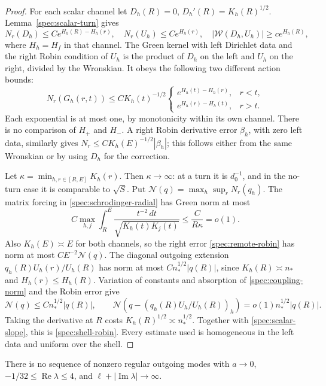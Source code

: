 \begin{proof}
For each scalar channel let $D_h(R)=0$, $D_h'(R)=K_h(R)^{1/2}$.
Lemma~\ref{spec:scalar-turn} gives
\[
 N_r(D_h)\le Ce^{H_h(R)-H_h(r)},\quad
 N_r(U_h)\le Ce^{H_h(r)},\quad
 |\mathcal W(D_h,U_h)|\ge ce^{H_h(R)},
\]
where $H_h=H_f$ in that channel. The Green kernel with left
Dirichlet data and the right Robin condition of $U_h$ is the product
of $D_h$ on the left and $U_h$ on the right, divided by the Wronskian.
It obeys the following two different action bounds:
\begin{equation}\label{spec:green-actions}
 N_r(G_h(r,t))\le C K_h(t)^{-1/2}
 \begin{cases}
 e^{H_h(t)-H_h(r)},&r<t,\\
 e^{H_h(r)-H_h(t)},&r>t.
 \end{cases}
\end{equation}
Each exponential is at most one, by monotonicity within its own
channel. There is no comparison of $H_+$ and $H_-$. A right Robin
derivative error $\beta_h$, with zero left data, similarly gives
$N_r\le CK_h(E)^{-1/2}|\beta_h|$; this follows either from the same
Wronskian or by using $D_h$ for the correction.

Let $\kappa=\min_{h,r\in[R,E]}K_h(r)$. Then $\kappa\to\infty$:
at a turn it is $d_0^{-1}$, and in the no-turn case it is comparable
to $\sqrt S$. Put $\mathcal N(q)=\max_h\sup_rN_r(q_h)$.
The matrix forcing in \eqref{spec:schrodinger-radial} has Green norm
at most
\begin{equation}\label{spec:coupling-norm}
 C\max_{h,j}\int_R^E
 \frac{t^{-2}\,dt}{\sqrt{K_h(t)K_j(t)}}
 \le\frac{C}{R\kappa}=o(1).
\end{equation}
Also $K_h(E)\asymp E$ for both channels, so the right error
\eqref{spec:remote-robin} has norm at most $CE^{-2}\mathcal N(q)$.
The diagonal outgoing extension
$q_h(R)U_h(r)/U_h(R)$ has norm at most
$Cn_*^{1/2}|q(R)|$, since $K_h(R)\asymp n_*$ and
$H_h(r)\le H_h(R)$. Variation of constants and absorption of
\eqref{spec:coupling-norm} and the Robin error give
\[
 \mathcal N(q)\le Cn_*^{1/2}|q(R)|,\qquad
 \mathcal N\left(q-\left(q_h(R)U_h/U_h(R)\right)_h\right)
 =o(1)n_*^{1/2}|q(R)|.
\]
Taking the derivative at $R$ costs $K_h(R)^{1/2}\asymp n_*^{1/2}$.
Together with \eqref{spec:scalar-slope}, this is
\eqref{spec:shell-robin}. Every estimate used is homogeneous in the
left data and uniform over the shell.
\end{proof}

\begin{lemma}\label{spec:high-exclusion}
There is no sequence of nonzero regular outgoing modes with $a\to0$,
$-1/32\le\operatorname{Re}\lambda\le4$, and
$\ell+|\operatorname{Im}\lambda|\to\infty$.
\end{lemma}

